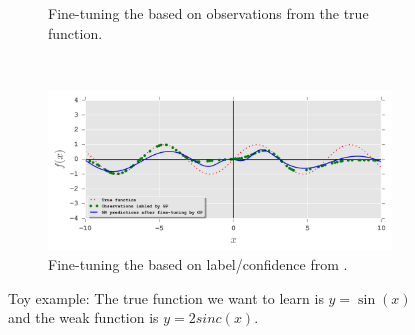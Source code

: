 \begin{figure}[!t]
\begin{subfigure}[t]{0.74\textwidth}
        \caption{\label{fig:toy_plot3}Fine-tuning the \std based on observations from the true function.}
    \end{subfigure}%
    \\
    \begin{subfigure}[t]{0.74\textwidth}
        \centering
        \includegraphics[trim={0 0.3cm 0 0},clip,width=1\textwidth]{03-part-02/chapter-05/figs_and_tables/fig_toy_ex_plot4.png}
        \caption{\label{fig:toy_plot4}Fine-tuning the \std based on label/confidence from \tch.}
    \end{subfigure}%
    \caption{Toy example: The true function we want to learn is $y = \sin(x)$ and the weak function is $y = 2 sinc(x)$.}
    \label{fig:toy}
\end{figure}